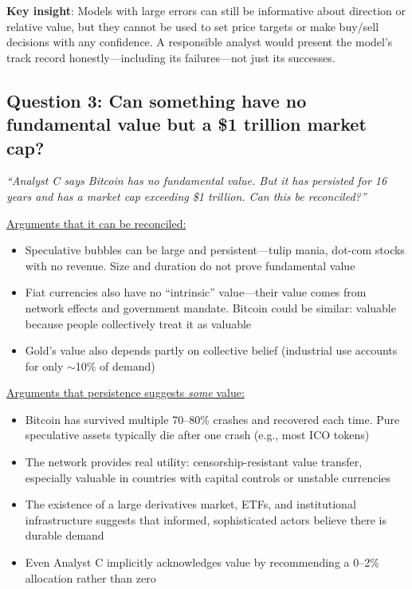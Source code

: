 \documentclass[11pt]{article}
\begin{document}
\medskip
\noindent\textbf{Key insight}: Models with large errors can still be informative about direction or relative value, but they cannot be used to set price targets or make buy/sell decisions with any confidence. A responsible analyst would present the model's track record honestly---including its failures---not just its successes.

\subsection*{Question 3: Can something have no fundamental value but a \$1 trillion market cap?}

\textit{``Analyst C says Bitcoin has no fundamental value. But it has persisted for 16 years and has a market cap exceeding \$1 trillion. Can this be reconciled?''}

\medskip
\noindent\underline{Arguments that it can be reconciled:}
\begin{itemize}[leftmargin=*]
\item Speculative bubbles can be large and persistent---tulip mania, dot-com stocks with no revenue. Size and duration do not prove fundamental value
\item Fiat currencies also have no ``intrinsic'' value---their value comes from network effects and government mandate. Bitcoin could be similar: valuable because people collectively treat it as valuable
\item Gold's value also depends partly on collective belief (industrial use accounts for only $\sim$10\% of demand)
\end{itemize}

\medskip
\noindent\underline{Arguments that persistence suggests \textit{some} value:}
\begin{itemize}[leftmargin=*]
\item Bitcoin has survived multiple 70--80\% crashes and recovered each time. Pure speculative assets typically die after one crash (e.g., most ICO tokens)
\item The network provides real utility: censorship-resistant value transfer, especially valuable in countries with capital controls or unstable currencies
\item The existence of a large derivatives market, ETFs, and institutional infrastructure suggests that informed, sophisticated actors believe there is durable demand
\item Even Analyst C implicitly acknowledges value by recommending a 0--2\% allocation rather than zero
\end{itemize}
\end{document}

